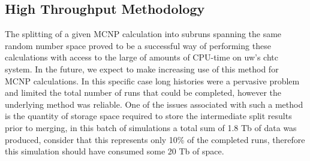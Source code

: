 \documentclass[12pt]{article}
\begin{document}
\subsection*{High Throughput Methodology}
The splitting of a given MCNP calculation into subruns spanning the same random
number space proved to be a successful way of performing these calculations with
access to the large of amounts of CPU-time on \gls{uw}'s \gls{chtc} system. In
the future, we expect to make increasing use of this method for MCNP
calculations. In this specific case long histories were a pervasive problem and
limited the total number of runs that could be completed, however the underlying
method was reliable. One of the issues associated with such a method is the
quantity of storage space required to store the intermediate split results prior
to merging, in this batch of simulations a total sum of 1.8 Tb of data was
produced, consider that this represents only 10\% of the completed runs,
therefore this simulation should have consumed some 20 Tb of space.
\end{document}
